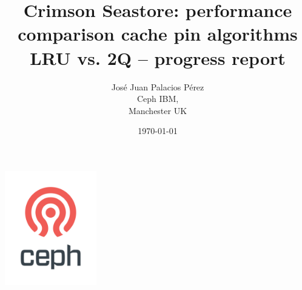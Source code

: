 \title{\textbf{Crimson Seastore: performance comparison cache pin algorithms LRU vs. 2Q} -- progress report}
\author{Jos\'e Juan Palacios P\'erez\\Ceph IBM,\\Manchester UK}
\date{\today}

\graphicspath{ {../figures/} }
\begin{titlepage}
 \begin{minipage}{\textwidth}
   \begin{center}
      \includegraphics[width=0.3\textwidth]{ceph_362px.png}
      \maketitle
   \end{center}
   
   \vspace{0.5cm}
   \vfill
  \end{minipage}
\end{titlepage}
\tableofcontents
